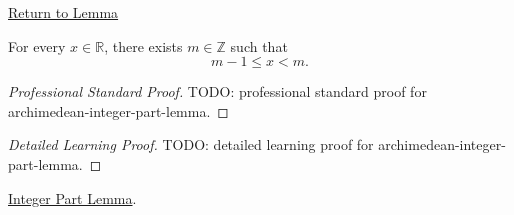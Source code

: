 \newpage
{}
\label{prf:archimedean-integer-part-lemma}

\begin{remark*}[Return]
\hyperref[lem:archimedean-integer-part-lemma]{Return to Lemma}
\end{remark*}

\begin{lemma*}
For every $x\in\mathbb{R}$, there exists $m\in\mathbb{Z}$ such that
\[
m-1\le x<m.
\]
\end{lemma*}

\begin{proof}[Professional Standard Proof]
\LRAProofBodyStart
TODO: professional standard proof for archimedean-integer-part-lemma.
\end{proof}

\begin{proof}[Detailed Learning Proof]
\LRAProofBodyStart
TODO: detailed learning proof for archimedean-integer-part-lemma.
\end{proof}

\begin{remark*}
\end{remark*}

\begin{dependencies}
\hyperref[lem:integer-part-lemma]{Integer Part Lemma}.
\end{dependencies}

\clearpage
